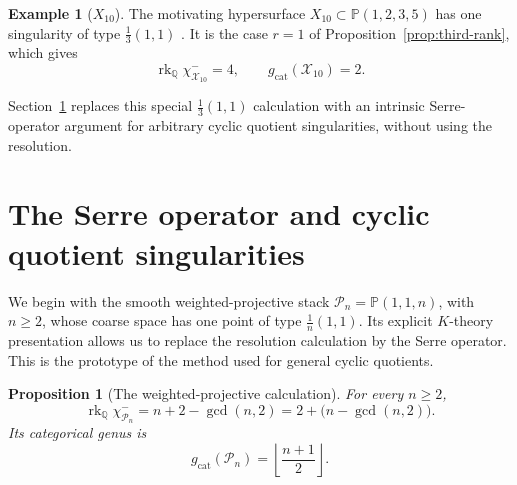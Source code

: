 \documentclass[11pt]{article}
\theoremstyle{plain}
\newtheorem{proposition}[theorem]{Proposition}
\theoremstyle{definition}
\newtheorem{example}[theorem]{Example}
\theoremstyle{remark}
\newcommand{\cX}{\mathcal X}
\newcommand{\rk}{\operatorname{rk}}
\newcommand{\Q}{\mathbb Q}
\newcommand{\Pj}{\mathbb P}
\newcommand{\1}{\mathbf 1}
\begin{document}
\begin{example}[$X_{10}$]\label{ex:x10-rank}
The motivating hypersurface $X_{10}\subset\Pj(1,2,3,5)$ has one singularity of type $\frac13(1,1)$ \cite[Section 7.3, entry 11]{OP}.  It is the case $r=1$ of Proposition~\ref{prop:third-rank}, which gives
\[
\rk_{\Q}\chi^-_{\cX_{10}}=4,
\qquad
g_{\mathrm{cat}}(\cX_{10})=2.
\]
\end{example}

Section~\ref{sec:serre} replaces this special $\frac13(1,1)$ calculation with an intrinsic Serre-operator argument for arbitrary cyclic quotient singularities, without using the resolution.

\section{The Serre operator and cyclic quotient singularities}\label{sec:serre}

We begin with the smooth weighted-projective stack $\mathcal P_n=\Pj(1,1,n)$, with $n\ge2$, whose coarse space has one point of type $\frac1n(1,1)$.  Its explicit $K$-theory presentation allows us to replace the resolution calculation by the Serre operator.  This is the prototype of the method used for general cyclic quotients.

\begin{proposition}[The weighted-projective calculation]\label{prop:weighted-rank}
For every $n\ge2$,
\[
\boxed{
\rk_{\Q}\chi^-_{\mathcal P_n}
=n+2-\gcd(n,2)
=2+\bigl(n-\gcd(n,2)\bigr).}
\]
Its categorical genus is
\[
\boxed{g_{\mathrm{cat}}(\mathcal P_n)=\left\lfloor\frac{n+1}{2}\right\rfloor.}
\]
\end{proposition}
\end{document}
